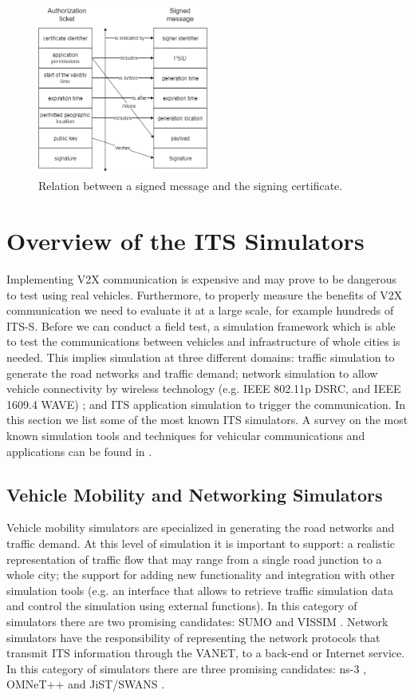 \begin{figure}
	\centering
	\includegraphics[width=0.5\textwidth]{Figures/relation.png}
	\caption{\label{fig:relation}Relation between a signed message and the signing certificate.}
\end{figure}


\section{Overview of the ITS Simulators}\label{simulators}
Implementing V2X communication is expensive and may prove to be dangerous to test using real vehicles. Furthermore, to properly measure the benefits of V2X communication we need to evaluate it at a large scale, for example hundreds of ITS-S. Before we can conduct a field test, a simulation framework which is able to test the communications between vehicles and infrastructure of whole cities is needed. This implies simulation at three different domains: traffic simulation to generate the road networks and traffic demand; network simulation to allow vehicle connectivity by wireless technology (e.g. IEEE 802.11p
DSRC, and IEEE 1609.4 WAVE) \cite{network_vehicle} \cite{network_vehicle2}; and ITS application simulation to trigger the communication. 
In this section we list some of the most known ITS simulators. A survey on the most known simulation tools and techniques for vehicular communications and applications can be found in \cite{sims}.

\subsection{Vehicle Mobility and Networking Simulators}
Vehicle mobility simulators are specialized in generating the road networks and traffic demand. At this level of simulation it is important to support: a realistic representation of traffic flow that may range from a single road junction to a whole city; the support for adding new functionality and integration with other simulation tools (e.g. an interface that allows to retrieve traffic simulation data and control the simulation using external functions). In this category of simulators there are two promising candidates: SUMO \cite{SUMO} and VISSIM \cite{vissim}. Network simulators have the responsibility of representing the network protocols that transmit ITS information through the VANET, to a back-end or Internet service. In this category of simulators there are three promising candidates: ns-3 \cite{ns3}, OMNeT++ \cite{omnet} and JiST\slash SWANS \cite{jist}.


